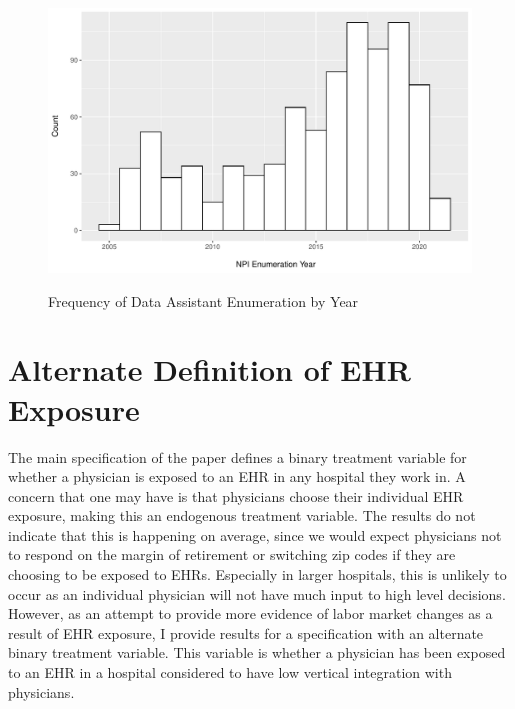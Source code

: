 \documentclass[11pt]{article}
\begin{document}
\begin{figure}[p]
\centering
\caption{Frequency of Data Assistant Enumeration by Year}
\includegraphics[scale=.5]{Objects/dataassistant_histogram.pdf}
\label{fig:dataassistant_histogram}
\end{figure}

\clearpage

\renewcommand*{\bibfont}{\footnotesize}

\printbibliography

\clearpage


\appendix

\section{Alternate Definition of EHR Exposure}

The main specification of the paper defines a binary treatment variable for whether a physician is exposed to an EHR in any hospital they work in. A concern that one may have is that physicians choose their individual EHR exposure, making this an endogenous treatment variable. The results do not indicate that this is happening on average, since we would expect physicians not to respond on the margin of retirement or switching zip codes if they are choosing to be exposed to EHRs. Especially in larger hospitals, this is unlikely to occur as an individual physician will not have much input to high level decisions. However, as an attempt to provide more evidence of labor market changes as a result of EHR exposure, I provide results for a specification with an alternate binary treatment variable. This variable is whether a physician has been exposed to an EHR in a hospital considered to have low vertical integration with physicians. 
\end{document}
